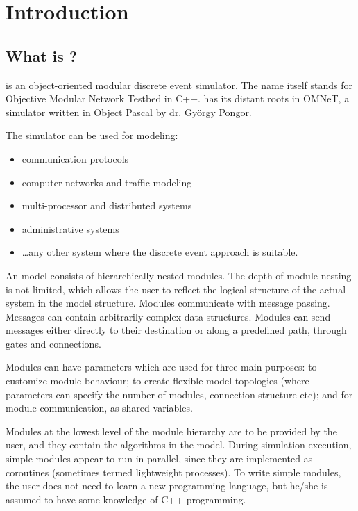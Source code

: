 \chapter{Introduction}
\label{cha:introduction}


\section{What is {\opp}?}

{\opp} is an object-oriented modular discrete event simulator. 
The name itself stands for Objective Modular Network Testbed 
in C++. {\opp} has its distant roots in OMNeT, a simulator written 
in Object Pascal by dr. Gy\"{o}rgy Pongor.

The simulator can be used for modeling:
\begin{itemize}
  \item{communication protocols}
  \item{computer networks and traffic modeling}
  \item{multi-processor and distributed systems}
  \item{administrative systems}
  \item{\dots any other system where the discrete event approach is
    suitable.}
\end{itemize}


An {\opp} model consists of hierarchically nested modules. The 
depth of module nesting is not limited, which allows the user 
to reflect the logical structure of the actual system in the 
model structure. Modules communicate with message passing. Messages 
can contain arbitrarily complex data structures. Modules can 
send messages either directly to their destination or along a 
predefined path, through gates and connections.


Modules can have parameters which are used for three main purposes: 
to customize module behaviour; to create flexible model topologies 
(where parameters can specify the number of modules, connection 
structure etc); and for module communication, as shared variables.

Modules at the lowest level of the module hierarchy are to be 
provided by the user, and they contain the algorithms in the 
model. During simulation execution, simple modules appear to 
run in parallel, since they are implemented as coroutines (sometimes 
termed lightweight processes). To write simple modules, the user 
does not need to learn a new programming language, but he/she 
is assumed to have some knowledge of C++ programming.

